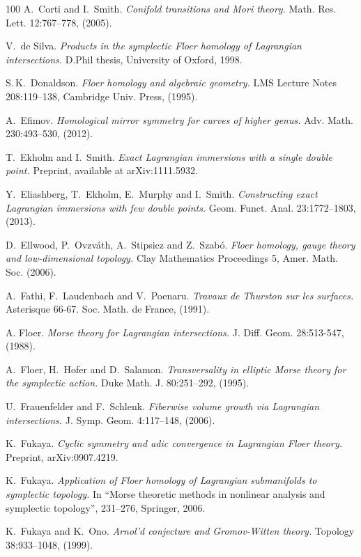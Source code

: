 \begin{thebibliography}{100}
A.~Corti and I.~Smith.
\emph{Conifold transitions and Mori theory.}
Math. Res. Lett. 12:767--778, (2005).

V.~de Silva.
\emph{Products in the symplectic Floer homology of Lagrangian intersections.}
D.Phil thesis, University of Oxford, 1998.

S.\,K.~Donaldson.
\emph{Floer homology and algebraic geometry.}
LMS Lecture Notes 208:119--138, Cambridge Univ. Press, (1995).

A.~Efimov.
\emph{Homological mirror symmetry for curves of higher genus.}
Adv. Math. 230:493--530, (2012).

T.~Ekholm and I.~Smith.
\emph{Exact Lagrangian immersions with a single double point.}
Preprint, available at arXiv:1111.5932.

Y.~Eliashberg, T.~Ekholm, E.~Murphy and I.~Smith.
\emph{Constructing exact Lagrangian immersions with few double points.}
Geom. Funct. Anal. 23:1772--1803, (2013).

D.~Ellwood, P.~Ovzv\'ath, A.~Stipsicz and Z.~Szab\'o.
\emph{Floer homology, gauge theory and low-dimensional topology.}
Clay Mathematics Proceedings 5, Amer. Math. Soc. (2006).

A.~Fathi, F.~Laudenbach and V.~Poenaru.
\emph{Travaux de Thurston sur les surfaces.}
Asterisque 66-67.  Soc. Math. de France, (1991).

A. Floer.
\emph{Morse theory for Lagrangian intersections.}
J. Diff. Geom. 28:513-547, (1988).

A.~Floer, H.~Hofer and D.~Salamon.
\emph{Transversality in elliptic Morse theory for the symplectic action.}
Duke Math. J. 80:251--292, (1995).

U.~Frauenfelder and F.~Schlenk.
\emph{Fiberwise volume growth via Lagrangian intersections.}
J. Symp. Geom. 4:117--148, (2006).

K.~Fukaya.
\emph{Cyclic symmetry and adic convergence in Lagrangian Floer theory.}
Preprint, arXiv:0907.4219.

K.~Fukaya.
\emph{Application of Floer homology of Lagrangian submanifolds to symplectic topology.}
In ``Morse theoretic methods in nonlinear analysis and symplectic topology”, 231--276, Springer, 2006.

K.~Fukaya and K.~Ono.
\emph{Arnol'd conjecture and Gromov-Witten theory.}
Topology 38:933--1048, (1999).


\end{thebibliography}
